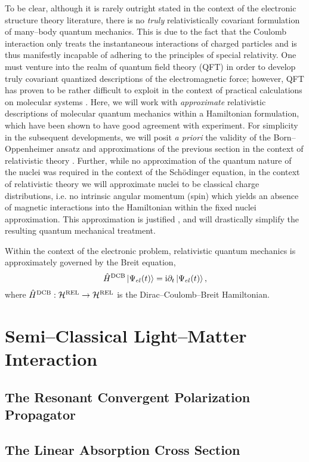 To be clear, although it is rarely outright stated in the context of the electronic structure theory
literature, there is no \emph{truly} relativistically covariant formulation of many--body quantum 
mechanics. This is due to the fact that the Coulomb interaction only treats the instantaneous interactions
of charged particles and is thus manifestly incapable of adhering to the principles of special relativity.
One must venture into the realm of quantum field theory (QFT) in order to develop truly covariant quantized 
descriptions of the electromagnetic force; however, QFT has proven to be rather difficult to exploit in
the context of practical calculations on molecular systems . Here, we will work with
\emph{approximate} relativistic descriptions of molecular quantum mechanics within a Hamiltonian
formulation, which have been shown to have good agreement with experiment.
For simplicity in the subsequent developments, we will posit \emph{a priori} the validity of the 
Born--Oppenheimer ansatz and approximations of the previous section in the context of relativistic
theory . Further, while no approximation of the quantum nature of the nuclei was required in the 
context of the Sch\"{o}dinger equation, in the context of relativistic theory we will approximate
nuclei to be classical charge distributions, i.e. no intrinsic angular momentum (spin) which
yields an absence of magnetic interactions into the Hamiltonian within the fixed nuclei approximation.
This approximation is justified , and will drastically simplify the resulting 
quantum mechanical treatment.

Within the context of the electronic problem, relativistic quantum mechanics is approximately governed
by the Breit equation,
\begin{equation}
\hat{H}^{\mathrm{DCB}} \left\vert \Psi_{el} (t) \right\rangle = \mathrm i \partial_t \left\vert \Psi_{el} (t) \right\rangle,
\end{equation}
where $\hat{H}^{\mathrm{DCB}} : \mathcal{H}^{\mathrm{REL}} \rightarrow \mathcal{H}^{\mathrm{REL}}$ is the Dirac--Coulomb--Breit Hamiltonian.









\section{Semi--Classical Light--Matter Interaction}
\label{sec:SCLMI}

\subsection{The Resonant Convergent Polarization Propagator}
\label{sec:PolarProp}

\subsection{The Linear Absorption Cross Section}
\label{sec:AbsorptionTheory}
